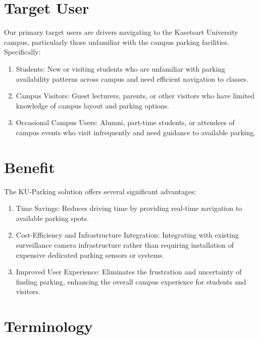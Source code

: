 \section{Target User}
\label{section:target-user}

Our primary target users are drivers navigating to the Kasetsart University campus, particularly those unfamiliar with the campus parking facilities. Specifically:
\begin{enumerate}[leftmargin=80pt]
\item Students: New or visiting students who are unfamiliar with parking availability patterns across campus and need efficient navigation to classes.
\item Campus Visitors: Guest lecturers, parents, or other visitors who have limited knowledge of campus layout and parking options.
\item Occasional Campus Users: Alumni, part-time students, or attendees of campus events who visit infrequently and need guidance to available parking.
\end{enumerate}
\section{Benefit}
\label{section:benefit}

The KU-Parking solution offers several significant advantages:

\begin{enumerate}[leftmargin=80pt]
    \item Time Savings: Reduces driving time by providing real-time navigation to available parking spots.
    
    \item Cost-Efficiency and Infrastructure Integration: Integrating with existing surveillance camera infrastructure rather than requiring installation of expensive dedicated parking sensors or systems.
    
    \item Improved User Experience: Eliminates the frustration and uncertainty of finding parking, enhancing the overall campus experience for students and visitors.
\end{enumerate}

\section{Terminology}
\label{section:terminology}


